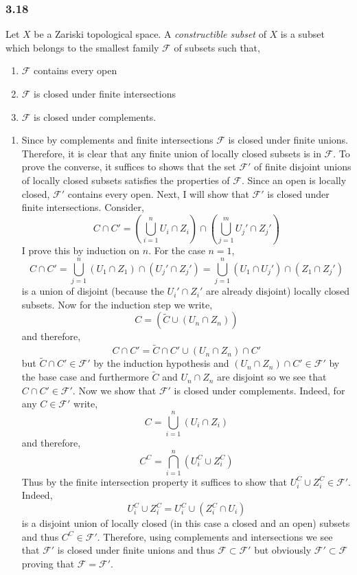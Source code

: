 \documentclass[12pt]{article}
\begin{document}
\subsubsection{3.18}

\newcommand{\cF}{\mathcal{F}}

Let $X$ be a Zariski topological space. A \textit{constructible subset} of $X$ is a subset which belongs to the smallest family $\cF$ of subsets such that,
\begin{enumerate}
\item $\cF$ contains every open
\item $\cF$ is closed under finite intersections
\item $\cF$ is closed under complements.
\end{enumerate}

\begin{enumerate}
\item Since by complements and finite intersections $\cF$ is closed under finite unions. Therefore, it is clear that any finite union of locally closed subsets is in $\cF$. To prove the converse, it suffices to shows that the set $\cF'$ of finite disjoint unions of locally closed subsets satisfies the properties of $\cF$. Since an open is locally closed, $\cF'$ contains every open. Next, I will show that $\cF'$ is closed under finite intersections. Consider,
\[ C \cap C' = \left( \bigcup_{i = 1}^n U_i \cap Z_i \right) \cap \left( \bigcup_{j = 1}^m U_j' \cap Z_j' \right) \]
I prove this by induction on $n$. For the case $n = 1$,
\[ C \cap C' = \bigcup_{j = 1}^n (U_1 \cap Z_1) \cap (U_j' \cap Z_j') = \bigcup_{j = 1}^n (U_1 \cap U_j') \cap (Z_1 \cap Z_j') \]
is a union of disjoint (because the $U_i' \cap Z_i'$ are already disjoint) locally closed subsets. Now for the induction step we write,
\[ C = (\tilde{C} \cup (U_n \cap Z_n)) \]
and therefore,
\[ C \cap C' = \tilde{C} \cap C' \cup (U_n \cap Z_n) \cap C' \]
but $\tilde{C} \cap C' \in \cF'$ by the induction hypothesis and $(U_n \cap Z_n) \cap C' \in \cF'$ by the base case and furthermore $\tilde{C}$ and $U_n \cap Z_n$ are disjoint so we see that $C \cap C' \in \cF'$. Now we show that $\cF'$ is closed under complements. Indeed, for any $C \in \cF'$ write,
\[ C = \bigcup_{i = 1}^n (U_i \cap Z_i) \]
and therefore,
\[ C^C = \bigcap_{i = 1}^n (U_i^C \cup Z_i^C) \]
Thus by the finite intersection property it suffices to show that $U_i^C \cup Z_i^C \in \cF'$. Indeed,
\[ U_i^C \cup Z_i^C = U_i^C \cup (Z_i^C \cap U_i) \]
is a disjoint union of locally closed (in this case a closed and an open) subsets and thus $C^C \in \cF'$. Therefore, using complements and intersections we see that $\cF'$ is closed under finite unions and thus $\cF \subset \cF'$ but obviously $\cF' \subset \cF$ proving that $\cF = \cF'$.


\end{enumerate}
\end{document}
